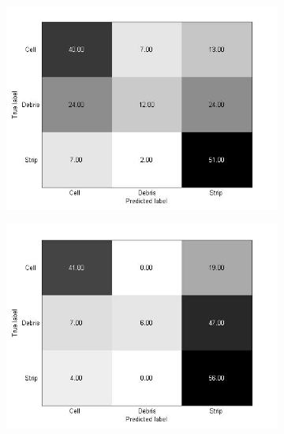 \begin{figure}[!h]
\begin{subfigure}[b]{0.3\textwidth}
    \caption{}
  \end{subfigure}
  \begin{subfigure}[b]{0.3\textwidth}
    \includegraphics[width=\textwidth]{confusion_matrix/fig3_3_c.jpg}
    \caption{}
  \end{subfigure}
  \begin{subfigure}[b]{0.3\textwidth}
    \includegraphics[width=\textwidth]{confusion_matrix/fig3_3_d.jpg}
    \caption{}
  \end{subfigure}
  \begin{subfigure}[b]{0.3\textwidth}

\end{subfigure}
\end{figure}
